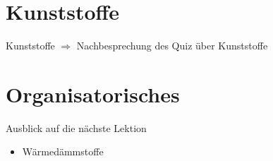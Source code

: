 
\section{Kunststoffe}
\BlueSectionSlide
\begin{frame}{Kunststoffe}
$\Rightarrow$ Nachbesprechung des Quiz über Kunststoffe
\end{frame}






\section{Organisatorisches}
\BlueSectionSlide







\begin{frame}{Ausblick auf die nächste Lektion}
\begin{itemize}
    \item Wärmedämmstoffe 
\end{itemize}
\end{frame}



